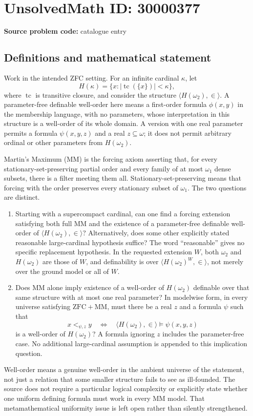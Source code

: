 \documentclass[11pt]{article}
\begin{document}
\section*{UnsolvedMath ID: 30000377}
\textbf{Source problem code:} catalogue entry
\subsection{Definitions and mathematical statement}
Work in the intended ZFC setting. For an infinite cardinal \(\kappa\), let
\[
 H(\kappa)=\{x:|\operatorname{tc}(\{x\})|<\kappa\},
\]
where \(\operatorname{tc}\) is transitive closure, and consider the structure \(\langle H(\omega_2),\in\rangle\). A parameter-free definable well-order here means a first-order formula \(\phi(x,y)\) in the membership language, with no parameters, whose interpretation in this structure is a well-order of its whole domain. A version with one real parameter permits a formula \(\psi(x,y,z)\) and a real \(z\subseteq\omega\); it does not permit arbitrary ordinal or other parameters from \(H(\omega_2)\).

Martin's Maximum (MM) is the forcing axiom asserting that, for every stationary-set-preserving partial order and every family of at most \(\omega_1\) dense subsets, there is a filter meeting them all. Stationary-set-preserving means that forcing with the order preserves every stationary subset of \(\omega_1\). The two questions are distinct.
\begin{enumerate}
\item Starting with a supercompact cardinal, can one find a forcing extension satisfying both full MM and the existence of a parameter-free definable well-order of \(\langle H(\omega_2),\in\rangle\)? Alternatively, does some other explicitly stated reasonable large-cardinal hypothesis suffice? The word ``reasonable'' gives no specific replacement hypothesis. In the requested extension \(W\), both \(\omega_2\) and \(H(\omega_2)\) are those of \(W\), and definability is over \(\langle H(\omega_2)^W,\in\rangle\), not merely over the ground model or all of \(W\).
\item Does MM alone imply existence of a well-order of \(H(\omega_2)\) definable over that same structure with at most one real parameter? In modelwise form, in every universe satisfying \(\mathrm{ZFC}+\mathrm{MM}\), must there be a real \(z\) and a formula \(\psi\) such that
\[
 x<_{\psi,z}y\quad\Longleftrightarrow\quad
 \langle H(\omega_2),\in\rangle\models\psi(x,y,z)
\]
is a well-order of \(H(\omega_2)\)? A formula ignoring \(z\) includes the parameter-free case. No additional large-cardinal assumption is appended to this implication question.
\end{enumerate}
Well-order means a genuine well-order in the ambient universe of the statement, not just a relation that some smaller structure fails to see as ill-founded. The source does not require a particular logical complexity or explicitly state whether one uniform defining formula must work in every MM model. That metamathematical uniformity issue is left open rather than silently strengthened.
\end{document}
